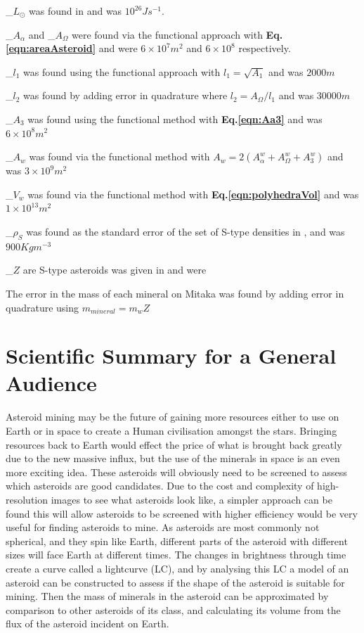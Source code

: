 \documentclass[10pt,twocolumn]{revtex4}    %
\newcommand*{\astrosun}{{\odot}}
\newcommand{\refeq}[1]{\textbf{Eq.#1}}
\newcommand{\E}[1]{\times10^{#1}}
\newcommand{\err}[1]{\alpha_{#1}}
\begin{document}
\err{$L_\astrosun$} was found in \cite{LSol} and was $10^{26} Js^{-1}$.

\err{$A_\alpha$} and \err{$A_\Omega$} were found via the functional approach with \refeq{\ref{eqn:areaAsteroid}} and were $6\E{7} m^2$ and $6\E{8}$ respectively.

\err{$l_1$} was found using the functional approach with $l_1 = \sqrt{A_1}$ and was $2000m$

\err{$l_2$} was found by adding error in quadrature where $l_2 = A_\Omega/l_1$ and was $30000m$

\err{$A_3$} was found using the functional method with \refeq{\ref{eqn:Aa3}} and was $6\E{8} m^2$

\err{$A_w$} was found via the functional method with $A_w = 2(A^w_\alpha + A^w_\Omega + A^w_3)$ and was $3\E{9} m^2$

\err{$V_w$} was found via the functional method with \refeq{\ref{eqn:polyhedraVol}} and was $1\E{13} m^2$

\err{$\rho_S$} was found as the standard error of the set of S-type densities in \cite{STypeDenstiy}, and was $900 Kg m^{-3}$

\err{$Z$} are S-type asteroids was given in \cite{sComp} and were 

The error in the mass of each mineral on Mitaka was found by adding error in quadrature using $m_{mineral} = m_w Z$ 




\clearpage

\onecolumngrid %

\section*{Scientific Summary for a General Audience}

Asteroid mining may be the future of gaining more resources either to use on Earth or in space to create a Human civilisation amongst the stars. Bringing resources back to Earth would effect the price of what is brought back greatly due to the new massive influx, but the use of the minerals in space is an even more exciting idea. These asteroids will obviously need to be screened to assess which asteroids are good candidates. Due to the cost and complexity of high-resolution images to see what asteroids look like, a simpler approach can be found this will allow asteroids to be screened with higher efficiency would be very useful for finding asteroids to mine. As asteroids are most commonly not spherical, and they spin like Earth, different parts of the asteroid with different sizes will face Earth at different times. The changes in brightness through time create a curve called a lightcurve (LC), and by analysing this LC a model of an asteroid can be constructed to assess if the shape of the asteroid is suitable for mining. Then the mass of minerals in the asteroid can be approximated by comparison to other asteroids of its class, and calculating its volume from the flux of the asteroid incident on Earth.
\end{document}
